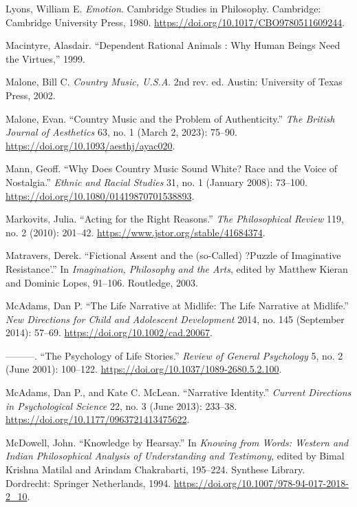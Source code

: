 \documentclass[phdthesis,12pt,final]{wuthesis}
\newlength{\cslhangindent}
\newenvironment{CSLReferences}[2] %
{\begin{list}{}{%
	\setlength{\itemindent}{0pt}
	\setlength{\leftmargin}{0pt}
	\setlength{\parsep}{0pt}
	\ifodd #1
	\setlength{\leftmargin}{\cslhangindent}
	\setlength{\itemindent}{-1\cslhangindent}
	\fi
	\setlength{\itemsep}{#2\baselineskip}}}
{\end{list}}
\theoremstyle{definition}
\theoremstyle{definition}
\theoremstyle{definition}
\theoremstyle{definition}
\theoremstyle{remark}
\begin{document}
\begin{CSLReferences}{1}{0}
Lyons, William E. \emph{Emotion}. Cambridge Studies in Philosophy. Cambridge: Cambridge University Press, 1980. \url{https://doi.org/10.1017/CBO9780511609244}.

Macintyre, Alasdair. {``Dependent Rational Animals : Why Human Beings Need the Virtues,''} 1999.

Malone, Bill C. \emph{Country Music, {U}.{S}.{A}}. 2nd rev. ed. Austin: University of Texas Press, 2002.

Malone, Evan. {``Country {Music} and the {Problem} of {Authenticity}.''} \emph{The British Journal of Aesthetics} 63, no. 1 (March 2, 2023): 75--90. \url{https://doi.org/10.1093/aesthj/ayac020}.

Mann, Geoff. {``Why Does Country Music Sound White? {Race} and the Voice of Nostalgia.''} \emph{Ethnic and Racial Studies} 31, no. 1 (January 2008): 73--100. \url{https://doi.org/10.1080/01419870701538893}.

Markovits, Julia. {``Acting for the {Right Reasons}.''} \emph{The Philosophical Review} 119, no. 2 (2010): 201--42. \url{https://www.jstor.org/stable/41684374}.

Matravers, Derek. {``Fictional {Assent} and the (so-{Called}) ?{Puzzle} of {Imaginative Resistance}'.''} In \emph{Imagination, {Philosophy} and the {Arts}}, edited by Matthew Kieran and Dominic Lopes, 91--106. Routledge, 2003.

McAdams, Dan P. {``The {Life Narrative} at {Midlife}: {The Life Narrative} at {Midlife}.''} \emph{New Directions for Child and Adolescent Development} 2014, no. 145 (September 2014): 57--69. \url{https://doi.org/10.1002/cad.20067}.

---------. {``The {Psychology} of {Life Stories}.''} \emph{Review of General Psychology} 5, no. 2 (June 2001): 100--122. \url{https://doi.org/10.1037/1089-2680.5.2.100}.

McAdams, Dan P., and Kate C. McLean. {``Narrative {Identity}.''} \emph{Current Directions in Psychological Science} 22, no. 3 (June 2013): 233--38. \url{https://doi.org/10.1177/0963721413475622}.

McDowell, John. {``Knowledge by {Hearsay}.''} In \emph{Knowing from {Words}: {Western} and {Indian Philosophical Analysis} of {Understanding} and {Testimony}}, edited by Bimal Krishna Matilal and Arindam Chakrabarti, 195--224. Synthese {Library}. Dordrecht: Springer Netherlands, 1994. \url{https://doi.org/10.1007/978-94-017-2018-2_10}.


\end{CSLReferences}
\end{document}
